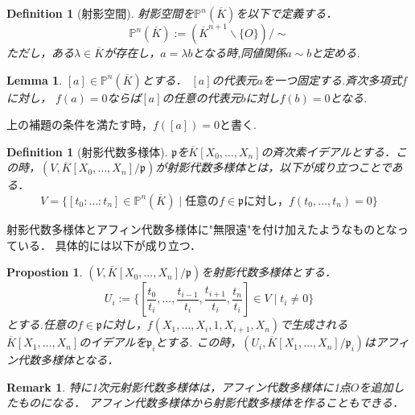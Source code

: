 \documentclass{ujarticle}
\newtheorem{dfn}[thm]{Definition}
\newtheorem{prop}[thm]{Propostion}
\newtheorem{lem}[thm]{Lemma}
\newtheorem*{rem}{Remark}
\begin{document}
\begin{dfn}[射影空間]
射影空間を$\mathbb{P}^n(\overline{K})$を以下で定義する．
\begin{equation*}
  \mathbb{P}^n(\overline{K}):=(\overline{K}^{n+1}\backslash\{O\})/{\sim}
\end{equation*}
ただし，ある$\lambda \in \overline{K}$が存在し，$a= \lambda b$となる時,同値関係$a \sim b$と定める.
\end{dfn}

\begin{lem}
 $[a] \in \mathbb{P}^n(\overline{K})$とする． $[a]$の代表元$a$を一つ固定する.斉次多項式$f$に対し，
 $f(a)=0$ならば$[a]$の任意の代表元$b$に対し$f(b)=0$となる.
\end{lem}

上の補題の条件を満たす時，$f([a])=0$と書く.

\begin{dfn}[射影代数多様体]
  $\mathfrak{p}$を$\overline{K}[X_0,\dots,X_n]$の斉次素イデアルとする．この時，$(V,\overline{K}[X_0,\dots,X_n]/\mathfrak{p})$が射影代数多様体とは，以下が成り立つことである．
  \begin{equation*}
   V=\{[t_0:\dots:t_n] \in \mathbb{P}^n(\overline{K}) \mid
   \mbox{任意の}f \in \mathfrak{p} \mbox{に対し，}f(t_0, \dots ,t_n)=0\}
  \end{equation*}
\end{dfn}

射影代数多様体とアフィン代数多様体に"無限遠"を付け加えたようなものとなっている．
具体的には以下が成り立つ．

\begin{prop}
$(V,\overline{K}[X_0 ,\dots,X_n]/\mathfrak{p})$を射影代数多様体とする．
\begin{equation*}
  U_i :=\{[\frac{t_0}{t_i},\dots,\frac{t_{i-1}}{t_i},\frac{t_{i+1}}{t_i},\frac{t_n}{t_i}]\in V \mid  t_i \neq 0\}
\end{equation*}
とする.任意の$f\in \mathfrak{p}$に対し，$f(X_1,\dots,X_i,1,X_{i+1},X_n)$で生成される$\overline{K}[X_1,\dots,X_n]$のイデアルを$\mathfrak{p}_i$とする.
この時，$(U_i,\overline{K}[X_1,\dots,X_n]/\mathfrak{p}_i)$はアフィン代数多様体となる．
\end{prop}
\begin{rem}
  特に1次元射影代数多様体は，アフィン代数多様体に1点$O$を追加したものになる．
  アフィン代数多様体から射影代数多様体を作ることもできる．
\end{rem}
\end{document}
